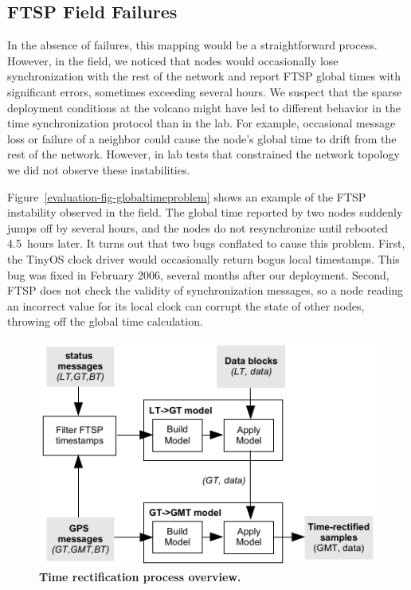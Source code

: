 \subsection{FTSP Field Failures}
\label{evaluation-timing-deploymentfailures}

In the absence of failures, this mapping would be a straightforward process.
However, in the field, we noticed that nodes would occasionally lose
synchronization with the rest of the network and report FTSP global times
with significant errors, sometimes exceeding several hours. We suspect that
the sparse deployment conditions at the volcano might have led to different
behavior in the time synchronization protocol than in the lab. For example,
occasional message loss or failure of a neighbor could cause the node's
global time to drift from the rest of the network. However, in lab tests that
constrained the network topology we did not observe these instabilities.

\vfill\eject

Figure~\ref{evaluation-fig-globaltimeproblem} shows an example of the FTSP
instability observed in the field. The global time reported by two nodes
suddenly jumps off by several hours, and the nodes do not resynchronize until
rebooted 4.5~hours later. It turns out that two bugs conflated to cause this
problem. First, the TinyOS clock driver would occasionally return bogus local
timestamps. This bug was fixed in February 2006, several months after our
deployment. Second, FTSP does not check the validity of synchronization
messages, so a node reading an incorrect value for its local clock can
corrupt the state of other nodes, throwing off the global time calculation.

\begin{figure}[t]
\begin{center}
\includegraphics[width=0.8\hsize]{./3-evaluation/figs/rectificationcartoon.pdf}
\end{center}

\caption{\textbf{Time rectification process overview.}}

\label{evaluation-fig-rectificationcartoon}
\end{figure}

